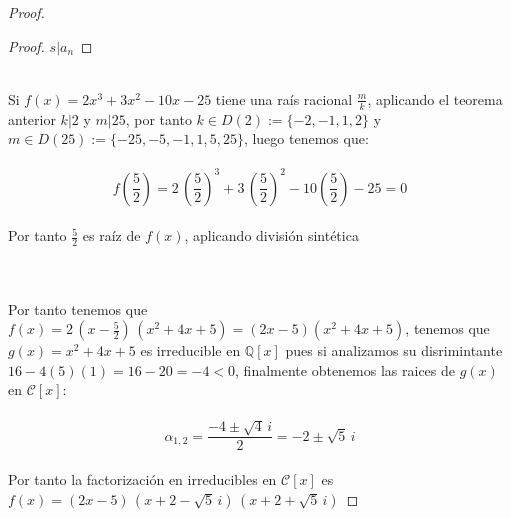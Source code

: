 \documentclass[11pt,letterpaper]{article}
\newcommand{\C}{\mathcal{C}}
\newcommand{\Q}{\mathbb{Q}}
\begin{document}
\begin{proof}
\begin{proof}
        $s|a_n$
    \end{proof}\,\\
    Si $f(x)=2x^3+3x^2-10x-25$ tiene una ra\'is racional $\frac{m}{k}$, aplicando el teorema anterior $k|2$ y $m|25$, por tanto $k\in D(2):=\{-2,-1,1,2\}$ y $m\in D(25):=\{-25,-5,-1,1,5,25\}$, luego tenemos que:\,\\
    \,\\
    \begin{equation*}
        f\left(\frac{5}{2}\right)=2\,\left(\frac{5}{2}\right)^3+3\,\left(\frac{5}{2}\right)^2-10\left(\frac{5}{2}\right)-25=0
    \end{equation*}\,\\
    Por tanto $\frac{5}{2}$ es ra\'iz de $f(x)$, aplicando divisi\'on sint\'etica\,\\
    \,\\
    \begin{center}
\end{center}\,\\
Por tanto tenemos que $f(x)=2\,\left(x-\frac{5}{2}\right)\,(x^2+4x+5)=(2x-5)(x^2+4x+5)$, tenemos que $g(x)=x^2+4x+5$ es irreducible en $\Q[x]$ pues si analizamos su disrimintante
$16-4(5)(1)=16-20=-4<0$, finalmente obtenemos las raices de $g(x)$ en $\C[x]$:\,\\
\,\\
\begin{equation*}
    \alpha_{1,2}=\frac{-4\pm\sqrt{4}\,i}{2}=-2\pm\sqrt{5}\,i
\end{equation*}\,\\
Por tanto la factorizaci\'on en irreducibles en $\C[x]$ es $f(x)=(2x-5)\,(x+2-\sqrt{5}\,i)\,(x+2+\sqrt{5}\,i)$
\end{proof}\,\\
\end{document}
